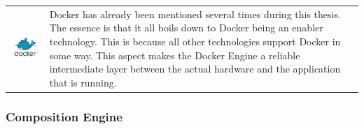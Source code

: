\begin{table}[h!]
  \centering
  \begin{tabular}{ c m{9cm} }
    \begin{minipage}{.3\textwidth}
      \includegraphics[width=\linewidth]{images/dependencies/docker}
    \end{minipage}&
    Docker has already been mentioned several times during this thesis. The
    essence is that it all boils down to Docker being an enabler technology.
    This is because all other technologies support Docker in some way. This
    aspect makes the Docker Engine a reliable intermediate layer between the
    actual hardware and the application that is running. 
  \end{tabular}
\end{table}
\FloatBarrier

\subsubsection{Composition Engine}


